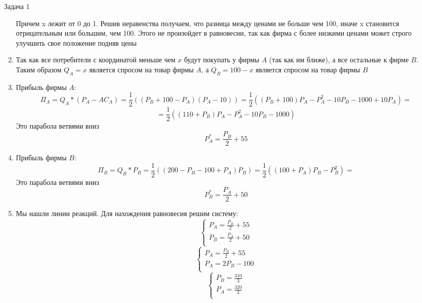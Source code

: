 \begin{mybox}{Задача 1}
\begin{enumerate}
        Причем x лежит от 0 до 1. Решив неравенства получаем, что разница между ценами не больше чем 100, иначе x
        становится отрицательным или большим, чем 100. Этого не произойдет в равновесии, так как фирма с более
        низкими ценами может строго улучшить свое положение подняв цены
        \item Так как все потребители с координатой меньше чем $x$ будут покупать у фирмы $A$ (так как им ближе), а все
        остальные к фирме $B$. Таким образом $Q_A=x$ является спросом на товар фирмы $A$, а $Q_B=100-x$ является
        спросом на товар фирмы $B$
        \item Прибыль фирмы $A$:
        $$\Pi_A=Q_A*(P_A-AC_A)=\frac{1}{2}((P_B+100-P_A)(P_A-10))=\frac{1}{2}((P_B+100)P_A-P_A^2-10P_B-1000+10P_A)=$$
        $$=\frac{1}{2}((110+P_B)P_A-P_A^2-10P_B-1000)$$
        Это парабола ветвями вниз
        $$P_A^*=\frac{P_B}{2}+55$$
        \item Прибыль фирмы $B$:
        $$\Pi_B=Q_B*P_B=\frac{1}{2}((200-P_B-100+P_A)P_B)=\frac{1}{2}((100+P_A)P_B-P_B^2)=$$
        Это парабола ветвями вниз
        $$P_B^*=\frac{P_A}{2}+50$$
        \item Мы нашли линии реакций. Для нахождения равновесия решим систему:
        $$\begin{cases}
            P_A=\frac{P_B}{2}+55 \\
            P_B=\frac{P_A}{2}+50 \\
        \end{cases}$$
        $$\begin{cases}
            P_A=\frac{P_B}{2}+55 \\
            P_A=2P_B-100 \\
        \end{cases}$$
        $$\begin{cases}
            P_B=\frac{310}{3} \\
            P_A=\frac{320}{3} \\
        \end{cases}$$
    \end{enumerate}
\end{mybox}

